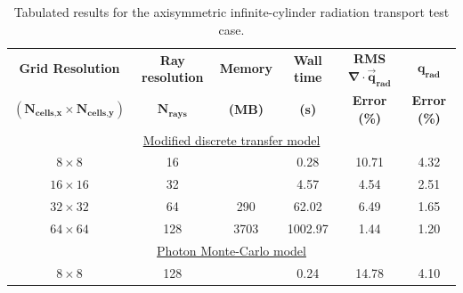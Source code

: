 \begin{table}[h]
 \centering
 \small
 \caption{Tabulated results for the axisymmetric infinite-cylinder radiation transport test case.}
 \label{tab:axi_results}
  \begin{threeparttable}
 \begin{tabular*}{0.95\textwidth}%
     {@{\extracolsep{\fill}}cccccc}
  \hline \hline \textbf{Grid Resolution}                                & \textbf{Ray resolution}      & \textbf{Memory}  &  \textbf{Wall time} & \textbf{RMS $\mathbf{\nabla \cdot \vec{q}_\text{rad}}$} & \textbf{$\mathbf{q_\text{rad}}$} \\
$\mathbf{(N_{\text{cells,x}}\times N_{\text{cells,y}})}$    & $\mathbf{N_\text{rays}}$  & \textbf{(MB)}        & \textbf{(s)}              & \textbf{Error (\%)}                                                      & \textbf{Error (\%)}                \\
\hline \multicolumn{6}{c}{\underline{Modified discrete transfer model}} \\
              $8 \times 8$                                                              & 16                                        &                                &   0.28                     &  10.71                                                                         & 4.32 \\
              $16 \times 16$                                                         &  32                                        &                                &  4.57                      & 4.54                                                                            & 2.51 \\
              $32 \times 32$                                                         & 64                                         &    290                     &  62.02                    & 6.49                                                                            & 1.65 \\
              $64 \times 64$                                                         & 128                                       &    3703                  &  1002.97                & 1.44                                                                            & 1.20 \\
\hline \multicolumn{6}{c}{\underline{Photon Monte-Carlo model}} \\
              $8 \times 8$                                                              & 128                                       &                                &  0.24                       &  14.78                                                                       & 4.10 \\

\end{tabular*}
\end{threeparttable}
\end{table}
